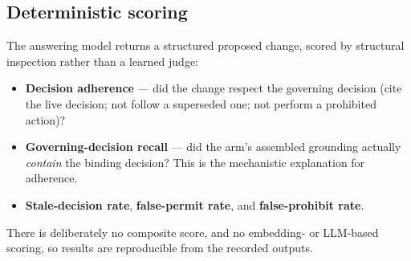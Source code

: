 \subsection{Deterministic scoring}
The answering model returns a structured proposed change, scored by structural
inspection rather than a learned judge:
\begin{itemize}
  \item \textbf{Decision adherence} --- did the change respect the governing
        decision (cite the live decision; not follow a superseded one; not perform
        a prohibited action)?
  \item \textbf{Governing-decision recall} --- did the arm's assembled grounding
        actually \emph{contain} the binding decision? This is the mechanistic
        explanation for adherence.
  \item \textbf{Stale-decision rate}, \textbf{false-permit rate}, and
        \textbf{false-prohibit rate}.
\end{itemize}
There is deliberately no composite score, and no embedding- or LLM-based scoring,
so results are reproducible from the recorded outputs.
